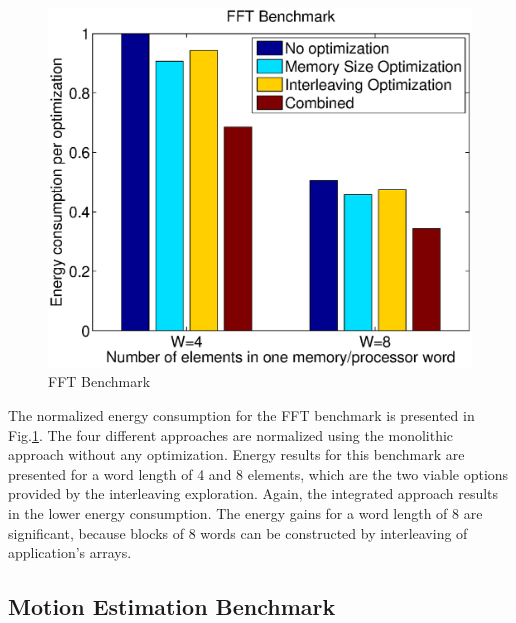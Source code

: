 \documentclass[prodmode,acmtecs]{acmsmall}
\begin{document}
\begin{figure}
\centering
	\includegraphics[scale = 0.5]{Images/fft.eps} 
	\caption{FFT Benchmark}
	\label{fig:fft}
\end{figure}

The normalized energy consumption for the FFT benchmark is presented in Fig.\ref{fig:fft}.
The four different approaches are normalized using the monolithic approach without any optimization.
Energy results for this benchmark are presented for a word length of 4 and 8 elements, which are the two viable options provided by the interleaving exploration.
Again, the integrated approach results in the lower energy consumption.
The energy gains for a word length of 8 are significant, because blocks of 8 words can be constructed by interleaving of application's arrays.

\subsection{Motion Estimation Benchmark}
\end{document}

